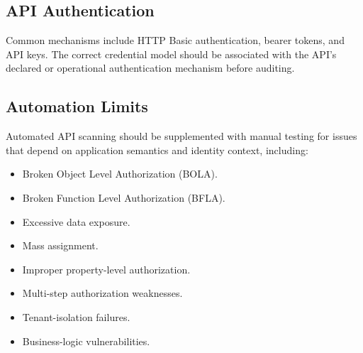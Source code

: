 \documentclass[11pt]{article}
\begin{document}
\begin{center}
\end{center}

\subsection{API Authentication}

Common mechanisms include HTTP Basic authentication, bearer tokens, and API keys. The correct credential model should be associated with the API's declared or operational authentication mechanism before auditing.

\subsection{Automation Limits}

Automated API scanning should be supplemented with manual testing for issues that depend on application semantics and identity context, including:

\begin{itemize}
  \item Broken Object Level Authorization (BOLA).
  \item Broken Function Level Authorization (BFLA).
  \item Excessive data exposure.
  \item Mass assignment.
  \item Improper property-level authorization.
  \item Multi-step authorization weaknesses.
  \item Tenant-isolation failures.
  \item Business-logic vulnerabilities.
\end{itemize}
\end{document}
